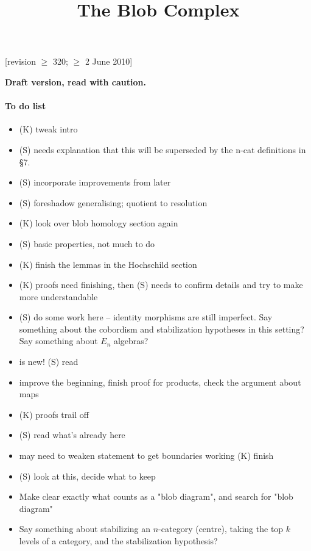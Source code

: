 \documentclass[11pt,leqno]{article}
\title{The Blob Complex}
\begin{document}
\makeatletter
{}
\gdef\theequation{\thesection.\arabic{equation}}
\makeatother

\maketitle

[revision $\ge$ 320;  $\ge$ 2 June 2010]

\textbf{Draft version, read with caution.}


\paragraph{To do list}
\begin{itemize}
\item[1] (K) tweak intro
\item[2] (S) needs explanation that this will be superseded by the n-cat
definitions in \S 7.
\item[2] (S) incorporate improvements from later
\item[2.3] (S) foreshadow generalising; quotient to resolution
\item[3] (K) look over blob homology section again
\item[4] (S) basic properties, not much to do
\item[5] (K) finish the lemmas in the Hochschild section
\item[6] (K) proofs need finishing, then (S) needs to confirm details and try
to make more understandable
\item[7] (S) do some work here -- identity morphisms are still imperfect. Say something about the cobordism and stabilization hypotheses \cite{MR1355899} in this setting? Say something about $E_n$ algebras?
\item[7.6] is new! (S) read
\item[8] improve the beginning, finish proof for products,
check the argument about maps
\item[9] (K) proofs trail off
\item[10] (S) read what's already here
\item[A] may need to weaken statement to get boundaries working (K) finish
\item[B] (S) look at this, decide what to keep

\item Make clear exactly what counts as a "blob diagram", and search for
"blob diagram"

\item Say something about stabilizing an $n$-category (centre), taking the top $k$ levels of a category, and the stabilization hypothesis?
\end{itemize}
\end{document}
